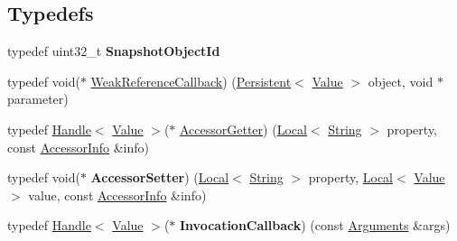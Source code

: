 \subsection*{Typedefs}
\begin{DoxyCompactItemize}
\item 
\hypertarget{namespacev8_acc05be0fdcf26b26fbb410e75a048e63}{}typedef uint32\+\_\+t {\bfseries Snapshot\+Object\+Id}\label{namespacev8_acc05be0fdcf26b26fbb410e75a048e63}

\item 
typedef void($\ast$ \hyperlink{namespacev8_a4d5db775dbc002b23f1b55ec7ce80ea5}{Weak\+Reference\+Callback}) (\hyperlink{classv8_1_1_persistent}{Persistent}$<$ \hyperlink{classv8_1_1_value}{Value} $>$ object, void $\ast$parameter)
\item 
typedef \hyperlink{classv8_1_1_handle}{Handle}$<$ \hyperlink{classv8_1_1_value}{Value} $>$($\ast$ \hyperlink{namespacev8_a3016fe071826349d1370a700e71be094}{Accessor\+Getter}) (\hyperlink{classv8_1_1_local}{Local}$<$ \hyperlink{classv8_1_1_string}{String} $>$ property, const \hyperlink{classv8_1_1_accessor_info}{Accessor\+Info} \&info)
\item 
\hypertarget{namespacev8_a6bf0ccffe563bf71d01828b3512705ed}{}typedef void($\ast$ {\bfseries Accessor\+Setter}) (\hyperlink{classv8_1_1_local}{Local}$<$ \hyperlink{classv8_1_1_string}{String} $>$ property, \hyperlink{classv8_1_1_local}{Local}$<$ \hyperlink{classv8_1_1_value}{Value} $>$ value, const \hyperlink{classv8_1_1_accessor_info}{Accessor\+Info} \&info)\label{namespacev8_a6bf0ccffe563bf71d01828b3512705ed}

\item 
\hypertarget{namespacev8_aa1cc8187a527d2cd85d6e4908c0a0513}{}typedef \hyperlink{classv8_1_1_handle}{Handle}$<$ \hyperlink{classv8_1_1_value}{Value} $>$($\ast$ {\bfseries Invocation\+Callback}) (const \hyperlink{classv8_1_1_arguments}{Arguments} \&args)\label{namespacev8_aa1cc8187a527d2cd85d6e4908c0a0513}


\end{DoxyCompactItemize}
